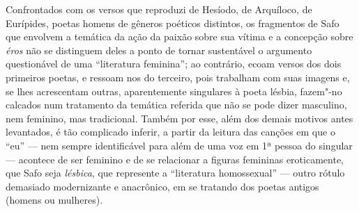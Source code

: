 Confrontados com os versos que reproduzi de Hesíodo, de Arquíloco, de Eurípides,
poetas homens de gêneros poéticos distintos, os fragmentos de Safo que envolvem
a temática da ação da paixão sobre sua vítima e a concepção sobre \textit{éros}
não se distinguem deles a ponto de tornar sustentável o argumento questionável
de uma “literatura feminina”; ao contrário, ecoam versos
dos dois primeiros poetas, e ressoam nos do terceiro, pois trabalham com
suas imagens e, se lhes acrescentam outras, aparentemente singulares à poeta
lésbia, fazem"-no calcados num tratamento da temática referida que não se pode
dizer masculino, nem feminino, mas tradicional. Também por esse, além dos demais motivos antes levantados, é tão complicado
inferir, a partir da leitura das canções em que o “eu” --- nem sempre
identificável para além de uma voz em 1ª pessoa do singular --- acontece de ser
feminino e de se relacionar a figuras femininas eroticamente, que Safo seja
\textit{lésbica}, que represente a “literatura homossexual” --- outro rótulo
demasiado modernizante e anacrônico, em se tratando dos poetas antigos
(homens ou mulheres).

